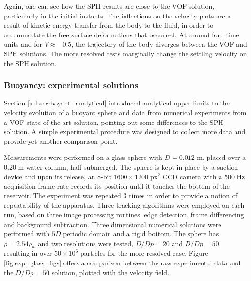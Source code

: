 Again, one can see how the \ac{SPH} results are close to the \ac{VOF} solution, particularly in the initial instants. The inflections on the velocity plots are a result of kinetic energy transfer from the body to the fluid, in order to accommodate the free surface deformations that occurred. At around four time units and for $V\approx-0.5$, the trajectory of the body diverges between the \ac{VOF} and \ac{SPH} solutions. The more resolved tests marginally change the settling velocity on the \ac{SPH} solution.

\subsubsection{Buoyancy: experimental solutions}

Section \ref{subsec:boyant_analytical} introduced analytical upper limits to the velocity evolution of a buoyant sphere and data from numerical experiments from a \ac{VOF} state-of-the-art solution, pointing out some differences to the \ac{SPH} solution. A simple experimental procedure was designed to collect more data and provide yet another comparison point.

Measurements were performed on a glass sphere with $D=0.012$ m, placed over a 0.20 m water column, half submerged. The sphere is kept in place by a suction device and upon its release, an 8-bit $1600\times1200\; \text{px}^2$ CCD camera with a 500 Hz acquisition frame rate records its position until it touches the bottom of the reservoir. The experiment was repeated 3 times in order to provide a notion of repeatability of the apparatus. Three tracking algorithms were employed on each run, based on three image processing routines: edge detection, frame differencing and background subtraction. Three dimensional numerical solutions were performed with $5D$ periodic domain and a rigid bottom. The sphere has $\rho=2.54\rho_{w}$ and two resolutions were tested, $D/Dp=20$ and $D/Dp=50$, resulting in over $50 \times 10^6$ particles for the more resolved case. Figure \ref{fig:exp_glass_figs} offers a comparison between the raw experimental data and the $D/Dp=50$ solution, plotted with the velocity field. 

